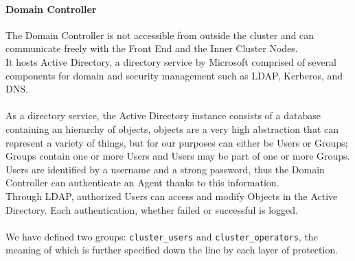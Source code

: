 \paragraph{Domain Controller}
The Domain Controller is not accessible from outside the cluster and can communicate freely with the Front End and the Inner Cluster Nodes.\\
It hosts Active Directory, a directory service by Microsoft comprised of several components for domain and security management such as LDAP, Kerberos, and DNS.\\ \\
As a directory service, the Active Directory instance consists of a database containing an hierarchy of objects, objects are a very high abstraction that can represent a variety of things, but for our purposes can either be Users or Groups; Groups contain one or more Users and Users may be part of one or more Groups. \\Users are identified by a username and a strong password, thus the Domain Controller can authenticate an Agent thanks to this information. \\
Through LDAP, authorized Users can access and modify Objects in the Active Directory. Each authentication, whether failed or successful is logged.\\ \\
We have defined two groups: \texttt{cluster\_users} and \texttt{cluster\_operators}, the meaning of which is further specified down the line by each layer of protection.

